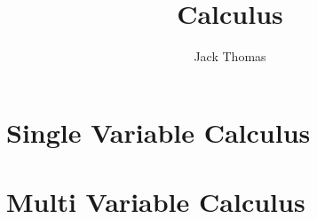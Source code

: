 \documentclass[]{report}
\begin{document}
\title{Calculus}
\author{Jack Thomas}
\date{}

\maketitle
\newpage

\tableofcontents
\newpage 
\part{Single Variable Calculus}






\part{Multi Variable Calculus}






\end{document}
